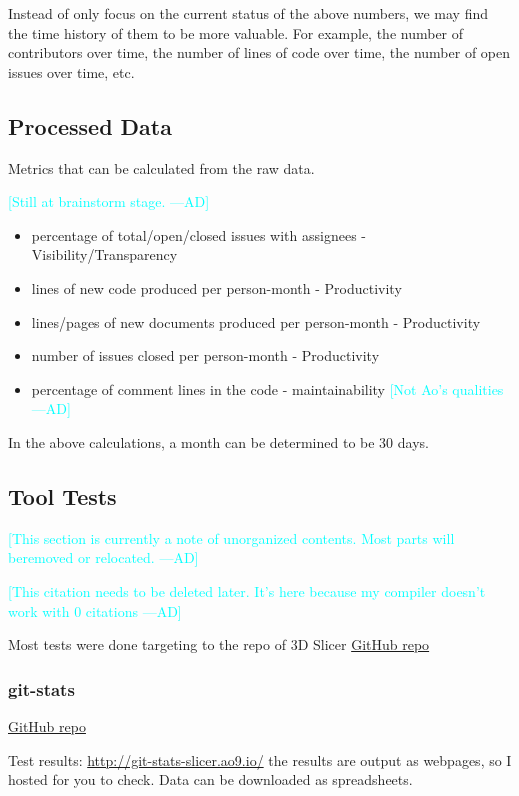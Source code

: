 \documentclass[letterpaper,cleveref]{lipics-v2019}
\newcommand{\authornote}[3]{\textcolor{#1}{[#3 ---#2]}}
\newcommand{\authornote}[3]{}
\newcommand{\ad}[1]{\authornote{cyan}{AD}{#1}} %
\theoremstyle{definition}
\begin{document}
Instead of only focus on the current status of the above numbers, we may find
the time history of them to be more valuable. For example, the number of
contributors over time, the number of lines of code over time, the number of
open issues over time, etc.

\subsection{Processed Data}
Metrics that can be calculated from the raw data.

\ad{Still at brainstorm stage.}
\begin{itemize}
\item percentage of total/open/closed issues with assignees -
Visibility/Transparency
\item lines of new code produced per person-month - Productivity
\item lines/pages of new documents produced per person-month - Productivity
\item number of issues closed per person-month - Productivity
\item percentage of comment lines in the code - maintainability \ad{Not Ao's
qualities}
\end{itemize}

In the above calculations, a month can be determined to be 30 days.

\subsection{Tool Tests}
\ad{This section is currently a note of unorganized contents. Most parts will beremoved or relocated.}

\ad{This citation needs to be deleted later. It's here because my compiler
doesn't work with 0 citations}
\cite{Emms2019}

Most tests were done targeting to the repo of 3D Slicer
\href{https://github.com/tomgi/git_stats}{GitHub repo}

\subsubsection{git-stats}
\href{https://github.com/tomgi/git_stats}{GitHub repo}

Test results:
\href{http://git-stats-slicer.ao9.io/}{http://git-stats-slicer.ao9.io/} the
results are output as webpages, so I hosted for you to check. Data can be
downloaded as spreadsheets.
\end{document}
